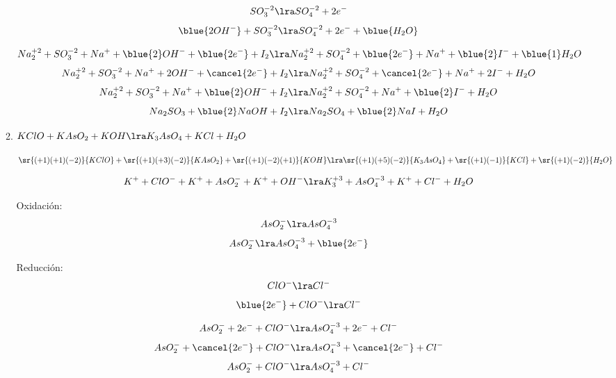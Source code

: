 \documentclass[../Práctica.root.tex]{subfiles}
\begin{document}
\begin{enumerate}
\begin{enumerate}

                    \[ SO_3^{-2} \lra SO_4^{-2} + 2 e^- \]
                    \[ \blue{2 OH^-} + SO_3^{-2} \lra SO_4^{-2} + 2 e^- + \blue{H_2O} \]

                    \[ Na_2^{+2} + SO_3^{-2} + Na^+ + \blue{2} OH^- + \blue{2 e^-} + I_2 \\
                        \lra Na_2^{+2} + SO_4^{-2} + \blue{2 e^-} + Na^+ + \blue{2} I^- + \blue{1} H_2O \]
                    \[ Na_2^{+2} + SO_3^{-2} + Na^+ + 2 OH^- + \cancel{2 e^-} + I_2 \\
                        \lra Na_2^{+2} + SO_4^{-2} + \cancel{2 e^-} + Na^+ + 2 I^- + H_2O \]
                    \[ Na_2^{+2} + SO_3^{-2} + Na^+ + \blue{2} OH^- + I_2 \\
                        \lra Na_2^{+2} + SO_4^{-2} + Na^+ + \blue{2} I^- + H_2O \]
                    \[ Na_2SO_3 + \blue{2} NaOH + I_2 \lra Na_2SO_4 + \blue{2} NaI + H_2O \]

              \item $KClO + KAsO_2 + KOH \lra K_3AsO_4 + KCl + H_2O$

                    $\sr{(+1)(+1)(-2)}{KClO} + \sr{(+1)(+3)(-2)}{KAsO_2} + \sr{(+1)(-2)(+1)}{KOH}
                        \lra \sr{(+1)(+5)(-2)}{K_3AsO_4} + \sr{(+1)(-1)}{KCl} + \sr{(+1)(-2)}{H_2O}$

                    \[ K^+ + ClO^- + K^+ + AsO_2^- + K^+ + OH^- \lra K_3^{+3} + AsO_4^{-3} + K^+ + Cl^- + H_2O \]
                    \begin{multicols}{2}
                        Oxidación:
                        \[ AsO_2^- \lra AsO_4^{-3} \]
                        \[ AsO_2^- \lra AsO_4^{-3} + \blue{2e^-} \]

                        \columnbreak

                        Reducción:
                        \[ ClO^- \lra Cl^- \]
                        \[ \blue{2e^-} + ClO^- \lra Cl^- \]
                    \end{multicols}

                    \[ AsO_2^- + 2e^- + ClO^- \lra AsO_4^{-3} + 2e^- + Cl^- \]
                    \[ AsO_2^- + \cancel{2e^-} + ClO^- \lra AsO_4^{-3} + \cancel{2e^-} + Cl^- \]
                    \[ AsO_2^- + ClO^- \lra AsO_4^{-3} + Cl^- \]


\end{enumerate}
\end{enumerate}
\end{document}
